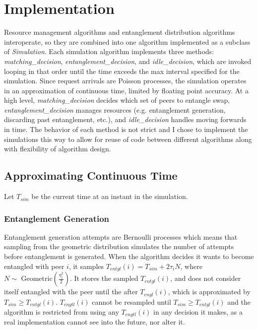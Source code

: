 \section{Implementation}
Resource management algorithms and entanglement distribution algorithms interoperate, so they are combined into one algorithm implemented as a subclass of \textit{Simulation}.
Each simulation algorithm implements three methods: \textit{matching\_decision}, \textit{entanglement\_decision}, and \textit{idle\_decision},
which are invoked looping in that order until the time exceeds the max interval specified for the simulation.
Since request arrivals are Poisson processes, the simulation operates in an approximation of continuous time, limited by floating point accuracy.
At a high level, \textit{matching\_decision} decides which set of peers to entangle swap,
\textit{entanglement\_decision} manages resources (e.g. entanglement generation, discarding past entanglement, etc.),
and \textit{idle\_decision} handles moving forwards in time.
The behavior of each method is not strict and I chose to implement the simulations this way to allow for reuse of code between different algorithms along with flexibility of algorithm design.
\subsection{Approximating Continuous Time}
Let $T_{sim}$ be the current time at an instant in the simulation.
\subsubsection{Entanglement Generation}
Entanglement generation attempts are Bernoulli processes which means that sampling from the geometric distribution simulates the number of attempts before entanglement is generated.
When the algorithm decides it wants to become entangled with peer $i$, it samples $T_{entgl}(i) = T_{sim}+2\tau_iN$, where $N \sim \text{ Geometric}(\frac{\eta_i^{2}}{2})$.
It stores the sampled $T_{entgl}(i)$, and does not consider itself entangled with the peer until the after $T_{engl}(i)$, which is approximated by $T_{sim} \geq T_{entgl}(i)$.
$T_{engtl}(i)$ cannot be resampled until $T_{sim} \geq T_{entgl}(i)$ and the algorithm is restricted from using any $T_{engtl}(i)$ in any decision it makes, as a real implementation cannot see into the future, nor alter it.
